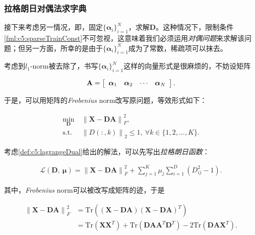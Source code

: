 \subsubsection{拉格朗日对偶法求字典}
接下来考虑另一情况，即，固定${\{\bm{\alpha}_i\}}_{i=1}^{N}$，求解$\mathbf{D}$。这种情况下，限制条件\eqref{fml:c5:sparseTrainConst}不可忽视，这意味着我们必须运用\emph{对偶问题}来求解该问题；但另一方面，所幸的是由于${\{\bm{\alpha}_i\}}_{i=1}^{N}$成为了常数，稀疏项可以抹去。

考虑到$l_1$-norm被去除了，书写${\{\bm{\alpha}_i\}}_{i=1}^{N}$这样的向量形式是很麻烦的，不妨设矩阵

\begin{equation}\label{fml:c5:reviseAlpha}
	\mathbf{A} = \left[
	\begin{array}{c c c c}
		\bm{\alpha}_1 & \bm{\alpha}_2 & \cdots & \bm{\alpha}_N
	\end{array}
	\right].
\end{equation}

于是，可以用矩阵的\textit{Frobenius} norm改写原问题，等效形式如下：

\begin{problem}[有限制条件的字典优化] \label{def:c5:SpsDictionary}
	\begin{subequations}
		\renewcommand{\theequation}
		{\theparentequation-\arabic{equation}}
		\begin{align}
			\min\limits_{\mathbf{D}}~&{\lVert \mathbf{X} - \mathbf{D}\mathbf{A}\rVert}^2_F, \label{fml:c5:SpsDictionary}\\
			\textrm{s.t.}~&{\lVert D(:,k) \rVert}_2 \leqslant 1,~\forall k \in \{1,2,\ldots,K\}. \label{fml:c5:SpsDictionaryConst}
		\end{align}
	\end{subequations}
\end{problem}

考虑\eqref{def:c5:lagrangeDual}给出的解法，可以先写出\emph{拉格朗日函数}：

\begin{equation}\label{fml:c5:SpsDicLag}
	\begin{aligned}
		\mathcal{L}(\mathbf{D},~\bm{\mu}) = {\lVert \mathbf{X} - \mathbf{D}\mathbf{A}\rVert}^2_F + \sum_{j=1}^{K}\mu_j\sum_{i=1}^{D}(D_{ij}^2-1).
	\end{aligned}
\end{equation}

其中，\textit{Frobenius} norm可以被改写成矩阵的迹，于是

\begin{equation}\label{fml:c5:SpsDicLag1}
	\begin{aligned}
		{\lVert \mathbf{X} - \mathbf{D}\mathbf{A}\rVert}^2_F &= \mathrm{Tr}((\mathbf{X} - \mathbf{D}\mathbf{A})(\mathbf{X} - \mathbf{D}\mathbf{A})^T) \\
		&= \mathrm{Tr}(\mathbf{X}\mathbf{X}^T) + \mathrm{Tr}(\mathbf{D}\mathbf{A}\mathbf{A}^T\mathbf{D}^T) -  2\mathrm{Tr}(\mathbf{D}\mathbf{A}\mathbf{X}^T).
	\end{aligned}
\end{equation}


